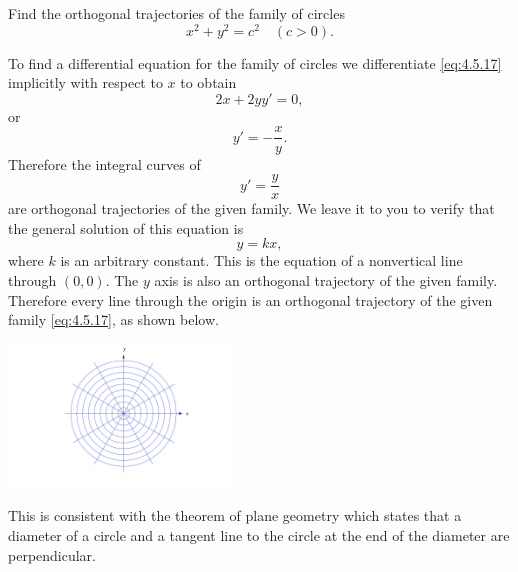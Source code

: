 \documentclass{ximera}
\begin{document}
\begin{example}\label{example:4.5.9}
Find the orthogonal trajectories of the family of circles
\begin{equation} \label{eq:4.5.17}
x^2+y^2=c^2 \quad (c>0).
\end{equation}

\begin{explanation}
To find a differential equation for the family of circles we
differentiate \eqref{eq:4.5.17} implicitly with respect to $x$ to obtain
$$
2x+2yy'=0,
$$
or
$$
y'=-\frac{x}{y}.
$$
Therefore the integral curves  of
$$
y'=\frac{y}{x}
$$
are orthogonal trajectories of the given family. We leave it to you to
verify that the general solution of this equation is
$$
y=kx,
$$
where $k$ is an arbitrary constant. This is the equation of a
nonvertical line through $(0,0)$. The $y$ axis is also an orthogonal
trajectory of the given family. Therefore every line through the
origin is an orthogonal trajectory of the given family \eqref{eq:4.5.17}, as shown below. 

\begin{image}
  \includegraphics[height=1.5in]{fig040511.jpg} 
\end{image}

This is consistent with the theorem of plane
geometry which states that a diameter of a circle and a tangent line
to the circle at the end of the diameter are perpendicular.
\end{explanation}
\end{example}
\end{document}
